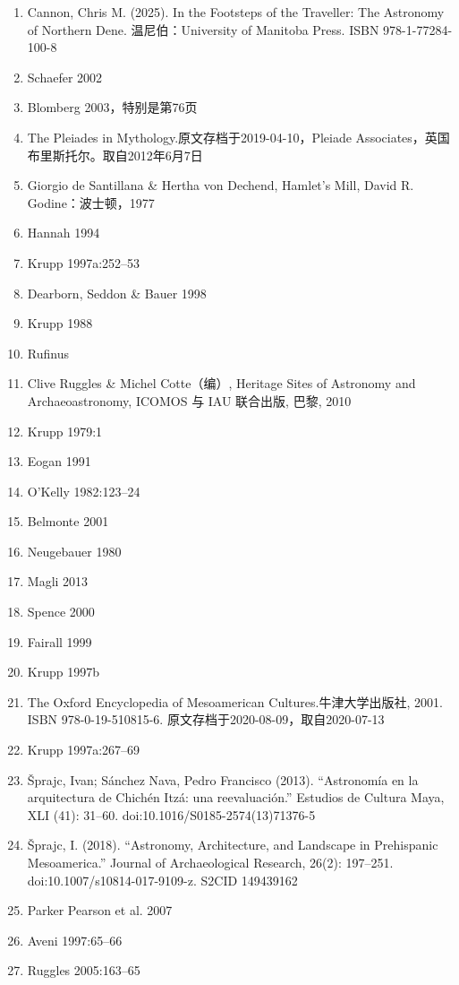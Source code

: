 \begin{enumerate}
    \item Cannon, Chris M. (2025). In the Footsteps of the Traveller: The Astronomy of Northern Dene. 温尼伯：University of Manitoba Press. ISBN 978-1-77284-100-8
    \item Schaefer 2002
    \item Blomberg 2003，特别是第76页
    \item The Pleiades in Mythology.原文存档于2019-04-10，Pleiade Associates，英国布里斯托尔。取自2012年6月7日
    \item Giorgio de Santillana \& Hertha von Dechend, Hamlet's Mill, David R. Godine：波士顿，1977
    \item Hannah 1994
    \item Krupp 1997a:252–53
    \item Dearborn, Seddon \& Bauer 1998
    \item Krupp 1988
    \item Rufinus
    \item Clive Ruggles \& Michel Cotte（编）, Heritage Sites of Astronomy and Archaeoastronomy, ICOMOS 与 IAU 联合出版, 巴黎, 2010
    \item Krupp 1979:1
    \item Eogan 1991
    \item O'Kelly 1982:123–24
    \item Belmonte 2001
    \item Neugebauer 1980
    \item Magli 2013
    \item Spence 2000
    \item Fairall 1999
    \item Krupp 1997b
    \item The Oxford Encyclopedia of Mesoamerican Cultures.牛津大学出版社, 2001. ISBN 978-0-19-510815-6. 原文存档于2020-08-09，取自2020-07-13
    \item Krupp 1997a:267–69
    \item Šprajc, Ivan; Sánchez Nava, Pedro Francisco (2013). “Astronomía en la arquitectura de Chichén Itzá: una reevaluación.” Estudios de Cultura Maya, XLI (41): 31–60. doi:10.1016/S0185-2574(13)71376-5
    \item Šprajc, I. (2018). “Astronomy, Architecture, and Landscape in Prehispanic Mesoamerica.” Journal of Archaeological Research, 26(2): 197–251. doi:10.1007/s10814-017-9109-z. S2CID 149439162
    \item Parker Pearson et al. 2007
    \item Aveni 1997:65–66
    \item Ruggles 2005:163–65

\end{enumerate}
